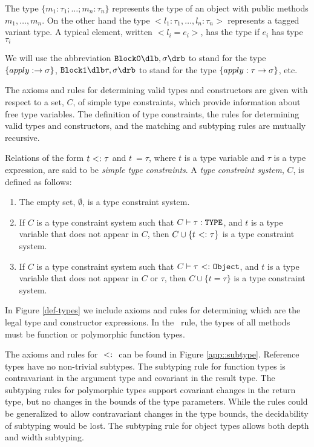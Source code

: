 The type $\{m_1: \tau_1;\ldots; m_n: \tau_n\}$ represents the type of 
an object with public methods $m_{1},\ldots,m_{n}$.  On the other hand
the type $<l_1: \tau_1 , \ldots, l_n: \tau_n >$ represents a tagged variant
type.  A typical element, written $<l_i = e_i>$, has the type if $e_i$ has type
$\tau_i$ 

We will use the abbreviation $\blkz {,\sigma}$ to stand for the type
$\{apply: \rightarrow \sigma\}$, $\blko {\tau,\sigma}$ to stand for the type
$\{apply: \tau \rightarrow \sigma\}$, etc.

The axioms and rules for determining valid types and constructors are
given with respect to a set, $C$, of simple type constraints,
which provide information about free type variables.  The definition
of type constraints, the rules for determining valid types and
constructors, and the matching and subtyping rules are mutually
recursive.

\begin{definition}
\label{Cdefinition}
Relations of the form $t {\rm \ <: \ } \tau$ and $t\ =
\tau$, where $t$ is a type variable and $\tau$ is a type expression,
are said to be \emph{simple type constraints\/}.  A \emph{type
constraint system}, $C$, is defined as follows:
\begin{enumerate}
\item The empty set, $\emptyset$, %
is a type constraint system.
\item If $C$ is a type constraint system such that
  $C \vdash \tau: {\tt TYPE}$, and $t$ is a type variable that
  does not appear in $C$,
  then $C \cup \{t {\rm \ <: \ } \tau\}$ is a type constraint system.
\item If $C$ is a type constraint system such that
  $C \vdash \tau {\rm \ <: \ } \mbox{\tt Object}$, and $t$ is a type variable that
  does not appear in $C$ or $\tau$,
  then $C \cup \{t = \tau\}$ is a type constraint system.
\end{enumerate}
\end{definition}

In Figure \ref{def-types} we include axioms and
rules for determining which are the legal type and constructor
expressions.  In the \Tobj\ rule, the types of all
methods must be function or polymorphic function types.

 The axioms and rules for ${\rm \ <: \ }$ can be found in Figure
\ref{app::subtype}.  Reference types have no
non-trivial subtypes.  The subtyping rule for function types is
contravariant in the argument type and covariant in the result type.
The subtyping rules for polymorphic types support covariant changes in
the return type, but no changes in the bounds of the type parameters.
While the rules could be generalized to allow contravariant changes in
the type bounds, the decidability of subtyping would be lost.  The
subtyping rule for object types allows both depth and width subtyping.

